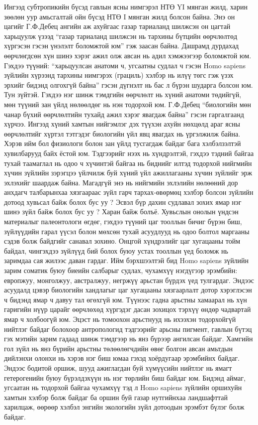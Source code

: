 Ингээд субтропикийн бүсэд гавлын ясны нимгэрэл НТӨ YI мянган жилд, харин зөөлөн уур амьсгалтай ойн бүсэд НТӨ I мянган жилд болсон байна. Энэ он цагийг Г.Ф.Дебец ангийн аж ахуйгаас газар тариаланд шилжсэн он цагтай харьцуулж үзээд “газар тариаланд шилжсэн нь тархины бүтцийн өөрчлөлтөд хүргэсэн гэсэн үнэлэлт боломжтой юм” гэж заасан байна. Дашрамд дурдахад өөрчлөгдсөн хүн шинэ хэрэг ажил олж авсан нь адил хэмжээгээр боломжтой юм. Гэхдээ түүний: “харьцуулсан анатоми ч, угсаатны судлал ч гэсэн Homo sapiens зүйлийн хүрээнд тархины нимгэрэх (грациль) хэлбэр нь илүү төгс гэж үзэх эрхийг бидэнд олгохгүй байна” гэсэн дүгнэлт нь бас л бүрэн шударга болсон юм. Тун зүйтэй. Гэхдээ нэг шинж тэмдгийн өөрчлөлт нь хүний анатоми төдийгүй, мөн түүний зан үйлд нөлөөлдөг нь нэн тодорхой юм. Г.Ф.Дебец “биологийн мөн чанар бүхий өөрчлөлтийн тухайд ажил хэрэг явагдаж байна” гэсэн гаргалгаанд хүрчээ. Ингээд хүний хамтын нийгэмлэг дэх түүхэн ахуйн нөхцөлд араг ясны өөрчлөлтийг хүртэл тэтгэдэг биологийн үйл явц явагдах нь үргэлжилж байна. Хэрэв ийм бол физиологи болон зан үйлд тусгагдаж байдаг бага хэлбэлзэлтэй хувилбарууд байх ёстой юм. Тэдгээрийг нээх нь хүндрэлтэй, гэхдээ тэдний байгаа тухай таамаглал нь одоо ч хүчинтэй байгаа нь биднийг илтэд тодорхой нийгмийн хүчин зүйлийн зэрэгцээ үйлчилж буй хүний үйл ажиллагааны хүчин зүйлийг эрж эхлэхийг шаардаж байна. Магадгүй энэ нь нийгмийн эхлэлийн нөлөөний дор анхдагч талбарынхаа хязгаараас зүйл гарч тархах-өвөрмөц хэлбэр болсон зүйлийн дотоод хувьсал байж болох бус уу ? Эсвэл бүр дахин судлавал зохих ямар нэг шинэ зүйл байж болох бус уу ? Харан байж болъё.
Хувьслын онолын үндсэн материалыг палеонтологи өгдөг, гэхдээ түүний цаг тооллын бичиг бүрэн биш, зүйлүүдийн гарал үүсэл болон мөхсөн тухай асуудлууд нь одоо болтол маргааны сэдэв болж байдгийг санавал зохино. Онцгой хүндрэлийг цаг хугацааны тойм байдал, чингэхдээ зүйлүүд бий болох буюу устах тооллын үед боломж нь заримдаа сая жилээс даван гардаг. Ийм бэрхшээлтэй бид Homo sapiens зүйлийн зарим соматик буюу биеийн салбарыг судлах, чухамхүү нэгдүгээр эрэмбийн: европжуу, монголжуу, австралжуу, негржүү арьстан бүрдэх үед тулгардаг. Эндээс асуудалд цэвэр биологийн хандлагыг цаг хугацааны хязгаарлалт дотор хэрэглэсэн ч бидэнд ямар ч давуу тал өгөхгүй юм. Түүнээс гадна арьстны хамаарал нь хүн гаригийн нүүр царайг өөрчлөхөд хүргэдэг дасан зохицох тэрхүү өндөр чадвартай ямар ч холбоогүй юм. Эцэст нь томоохон арьстнууд нь ихээхэн тодорхойгүй нийтлэг байдаг болохоор антропологид тэдгээрийг арьсны пигмент, гавлын бүтэц гэх мэтийн зарим гадаад шинж тэмдгээр нь янз бүрээр ангилсан байдаг. Хамгийн гол зүйл нь янз бүрийн арьстны төлөөлөгчдийн өвөг болгон авсан амьтдын дийлэнхи олонхи нь хэрэв нэг биш юмаа гэхэд хоёрдугаар эрэмбийнх байдаг. Эндээс бодитой оршиж, шууд ажиглагдан буй хүмүүсийн нийтлэг нь ямагт гетерогенийн буюу бүрэлдэхүүн нь нэг төрлийн биш байдаг юм. Бидэнд аймаг, угсаатан нь тодорхой байгаа чухамхүү тэд л Homo sapiens зүйлийн оршихуйн хамтын хэлбэр болж байдаг ба оршин буй газар нутгийнхаа ландшафттай харилцаж, өөрөөр хэлбэл энгийн экологийн зүйл дотоодын эрэмбэт бүлэг болж байдаг.
